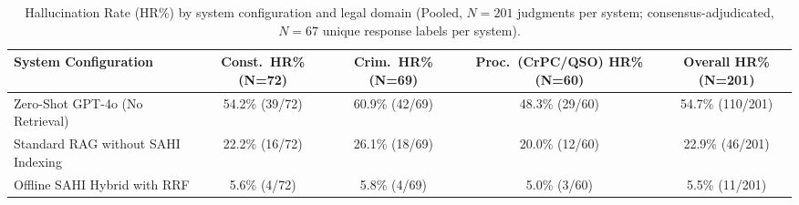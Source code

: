 \documentclass[11pt]{article}
\newcommand{\rev}[1]{#1}
\begin{document}
\vspace*{1cm}
\setcounter{table}{2}

\begin{table}[H]
\caption{\rev{Hallucination Rate (HR\%) by system configuration and legal domain
(Pooled, $N = 201$ judgments per system; consensus-adjudicated, $N = 67$ unique
response labels per system).}}
\label{tab:hr}
\centering
\small
\begin{tabularx}{\textwidth}{|X|c|c|c|c|}
\hline
\textbf{System Configuration} & \textbf{Const.\ HR\% (N=72)} & \textbf{Crim.\ HR\% (N=69)}
  & \textbf{Proc.\ (CrPC/QSO) HR\% (N=60)} & \textbf{Overall HR\% (N=201)} \\ \hline
Zero-Shot GPT-4o (No Retrieval)              & 54.2\% (39/72) & 60.9\% (42/69) & 48.3\% (29/60) & 54.7\% (110/201) \\ \hline
Standard RAG without SAHI Indexing           & 22.2\% (16/72) & 26.1\% (18/69) & 20.0\% (12/60) & 22.9\% (46/201)  \\ \hline
\rev{Offline SAHI Hybrid with RRF}            & 5.6\% (4/72)   & 5.8\% (4/69)   & 5.0\% (3/60)   & 5.5\% (11/201)   \\ \hline
\end{tabularx}
\end{table}
\end{document}
